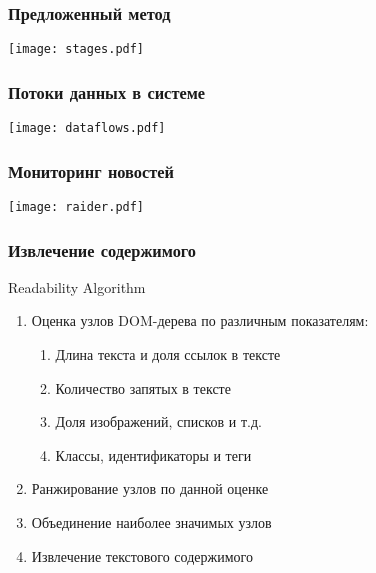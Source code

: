 \documentclass[hyperref={unicode}, 14pt, aspectratio=169]{beamer}
\begin{document}
\begin{frame}
    \frametitle{Предложенный метод}

    \begin{center}
        \texttt{[image: stages.pdf]}
    \end{center}
\end{frame}

\begin{frame}
    \frametitle{Потоки данных в системе}

    \begin{center}
        \texttt{[image: dataflows.pdf]}
    \end{center}
\end{frame}

\begin{frame}
    \frametitle{Мониторинг новостей}

    \begin{center}
        \texttt{[image: raider.pdf]}
    \end{center}
\end{frame}

\begin{frame}
    \frametitle{Извлечение содержимого}

    \begin{block}{Readability Algorithm}
        \begin{enumerate}
            \item Оценка узлов DOM-дерева по различным показателям:
                \begin{enumerate}
                    \item Длина текста и доля ссылок в тексте
                    \item Количество запятых в тексте
                    \item Доля изображений, списков и т.д.
                    \item Классы, идентификаторы и теги
                \end{enumerate}
            \item Ранжирование узлов по данной оценке
            \item Объединение наиболее значимых узлов
            \item Извлечение текстового содержимого
        \end{enumerate}
    \end{block}
\end{frame}
\end{document}
